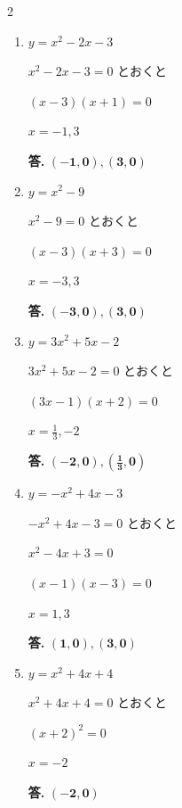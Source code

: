 \documentclass[a4paper, 11pt]{jsarticle}
\begin{document}
\begin{multicols*}{2}
\begin{enumerate}[label=(\arabic*)]
{    $x = -1, 4$
    
    \textbf{答.} $\boldsymbol{(-1, 0), (4, 0)}$
    }
    \vspace*{\fill}
    
    \columnbreak

    \item $y = x^2 - 2x - 3$
    
    {\color{red}
    $x^2 - 2x - 3 = 0$ とおくと
    
    $(x - 3)(x + 1) = 0$
    
    $x = -1, 3$
    
    \textbf{答.} $\boldsymbol{(-1, 0), (3, 0)}$
    }
    \vspace*{\fill}

    \item $y = x^2 - 9$
    
    {\color{red}
    $x^2 - 9 = 0$ とおくと
    
    $(x - 3)(x + 3) = 0$
    
    $x = -3, 3$
    
    \textbf{答.} $\boldsymbol{(-3, 0), (3, 0)}$
    }
    \vspace*{\fill}

    \item $y = 3x^2 + 5x - 2$
    
    {\color{red}
    $3x^2 + 5x - 2 = 0$ とおくと
    
    $(3x - 1)(x + 2) = 0$
    
    $x = \frac{1}{3}, -2$
    
    \textbf{答.} $\boldsymbol{(-2, 0), \left(\frac{1}{3}, 0\right)}$
    }
    \vspace*{\fill}

    \item $y = -x^2 + 4x - 3$
    
    {\color{red}
    $-x^2 + 4x - 3 = 0$ とおくと
    
    $x^2 - 4x + 3 = 0$
    
    $(x - 1)(x - 3) = 0$
    
    $x = 1, 3$
    
    \textbf{答.} $\boldsymbol{(1, 0), (3, 0)}$
    }
    \vspace*{\fill}

    \item $y = x^2 + 4x + 4$
    
    {\color{red}
    $x^2 + 4x + 4 = 0$ とおくと
    
    $(x + 2)^2 = 0$
    
    $x = -2$
    
    \textbf{答.} $\boldsymbol{(-2, 0)}$
    }
    \vspace*{\fill}

\end{enumerate}
\end{multicols*}
\end{document}
